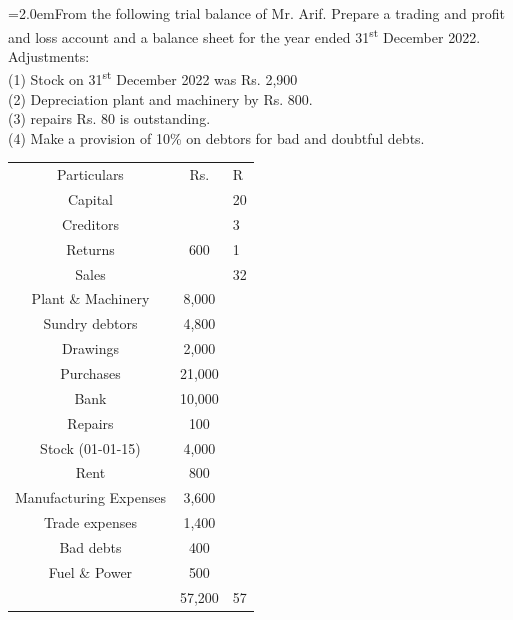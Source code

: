 \documentclass[11pt,a4paper]{article}
\newcommand{\lqn}[2]{\Needspace{6\baselineskip}\par\medskip\noindent\hangindent=2.0em\hangafter=1\makebox[2.0em][l]{\textbf{#1.}}#2\par}
\begin{document}
\lqn{102}{From the following trial balance of Mr. Arif. Prepare a trading and profit and loss account and a balance sheet for the year ended 31\textsuperscript{st} December 2022.\\
Adjustments:\\
(1) Stock on 31\textsuperscript{st}  December 2022 was Rs. 2,900\\
(2) Depreciation plant and machinery by Rs. 800.\\
(3) repairs Rs. 80 is outstanding.\\
(4) Make a provision of 10\% on debtors for bad and doubtful debts.\par
\par\smallskip\noindent\hspace*{1.2em}\begin{tabular}{|ccl|}
\hline
Particulars & Rs. & R \\
Capital &  & 20 \\
Creditors &  & 3 \\
Returns & 600 & 1 \\
Sales &  & 32 \\
Plant \& Machinery & 8,000 &  \\
Sundry debtors & 4,800 &  \\
Drawings & 2,000 &  \\
Purchases & 21,000 &  \\
Bank & 10,000 &  \\
Repairs & 100 &  \\
Stock (01-01-15) & 4,000 &  \\
Rent & 800 &  \\
Manufacturing Expenses & 3,600 &  \\
Trade expenses & 1,400 &  \\
Bad debts & 400 &  \\
Fuel \& Power & 500 &  \\
 & 57,200 & 57 \\
\hline
\end{tabular}\par\smallskip
}
\end{document}
